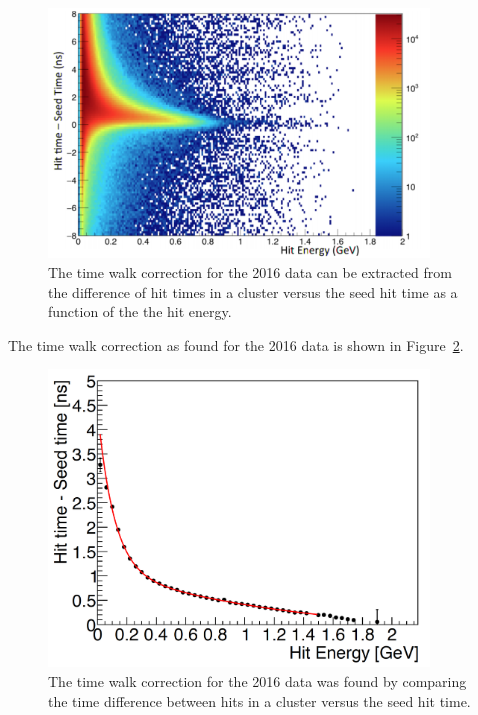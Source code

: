 \begin{figure}[H]
  \centering
      \includegraphics[width=0.9\textwidth]{pics/performance/hittimeincluster.png}
  \caption[Hit times in a cluster versus the hit energy]{The time walk correction for the 2016 data can be extracted from the difference of hit times in a cluster versus the seed hit time as a function of the the hit energy.}
  \label{Figure:hittimeincluster}
\end{figure}

The time walk correction as found for the 2016 data is shown in Figure~\ref{Figure:twalk}. 

\begin{figure}[H]
  \centering
      \includegraphics[width=0.9\textwidth]{pics/performance/twalk2016.png}
  \caption[Time walk correction for the 2016 Ecal data]{The time walk correction for the 2016 data was found by comparing the time difference between hits in a cluster versus the seed hit time.}
  \label{Figure:twalk}
\end{figure}

